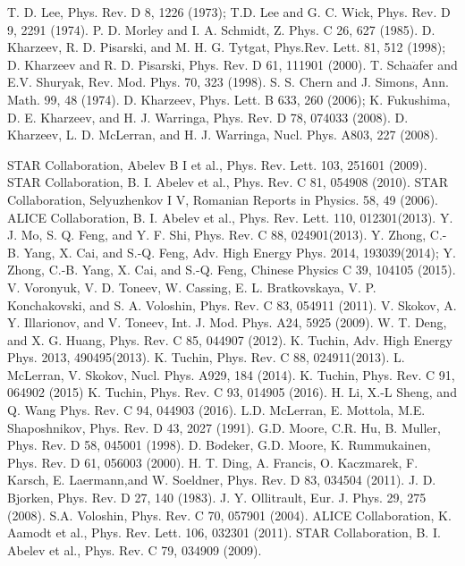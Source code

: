 \documentclass[twocolumn,showpacs,preprintnumbers,amsmath,amssymb]{revtex4}
\begin{document}
\begin{thebibliography}{}
 T. D. Lee, Phys. Rev. D 8, 1226 (1973); T.D. Lee and G. C. Wick, Phys. Rev. D 9, 2291 (1974).
 P. D. Morley and I. A. Schmidt, Z. Phys. C 26, 627 (1985).
 D. Kharzeev, R. D. Pisarski, and M. H. G. Tytgat, Phys.Rev. Lett. 81, 512 (1998); D. Kharzeev and R. D. Pisarski,
Phys. Rev. D 61, 111901 (2000).
 T. Scha$\ddot{a}$fer and E.V. Shuryak, Rev. Mod. Phys. 70, 323 (1998).
 S. S. Chern and J. Simons, Ann. Math. 99, 48 (1974).
 D. Kharzeev, Phys. Lett. B 633, 260 (2006); K. Fukushima, D. E. Kharzeev, and H. J. Warringa, Phys.
Rev. D 78, 074033 (2008).
 D. Kharzeev, L. D. McLerran, and H. J. Warringa, Nucl. Phys. A803, 227 (2008).


 STAR Collaboration, Abelev B I et al., Phys. Rev. Lett. 103, 251601 (2009).
 STAR Collaboration, B. I. Abelev et al., Phys. Rev. C 81, 054908 (2010).
 STAR Collaboration, Selyuzhenkov I V, Romanian Reports in Physics. 58, 49 (2006).
 ALICE Collaboration, B. I. Abelev et al., Phys. Rev. Lett. 110, 012301(2013).
 Y. J. Mo, S. Q. Feng, and Y. F. Shi,  Phys. Rev. C 88,  024901(2013).
 Y. Zhong, C.-B. Yang, X. Cai, and S.-Q. Feng, Adv. High Energy Phys. 2014, 193039(2014); Y. Zhong, C.-B. Yang, X. Cai, and S.-Q. Feng, Chinese Physics C 39, 104105 (2015).
 V. Voronyuk, V. D. Toneev, W. Cassing, E. L. Bratkovskaya, V. P. Konchakovski, and S. A. Voloshin, Phys. Rev. C 83, 054911 (2011).
 V. Skokov, A. Y. Illarionov, and V. Toneev, Int. J. Mod. Phys. A24, 5925 (2009).
 W. T. Deng, and X. G. Huang, Phys. Rev. C 85, 044907 (2012).
 K. Tuchin,  Adv. High Energy Phys. 2013, 490495(2013).
 K. Tuchin, Phys. Rev. C 88, 024911(2013).
 L. McLerran, V. Skokov, Nucl. Phys. A929, 184 (2014).
 K. Tuchin, Phys. Rev. C 91, 064902 (2015)
 K. Tuchin, Phys. Rev. C 93, 014905 (2016).
 H. Li, X.-L Sheng, and Q. Wang Phys. Rev. C 94, 044903 (2016).
 L.D. McLerran, E. Mottola, M.E. Shaposhnikov, Phys. Rev. D 43, 2027 (1991).
 G.D. Moore, C.R. Hu, B. Muller, Phys. Rev. D 58,  045001 (1998).
 D. B$\ddot{o}$deker, G.D. Moore, K. Rummukainen, Phys. Rev. D 61, 056003 (2000).
 H. T. Ding, A. Francis, O. Kaczmarek, F. Karsch, E. Laermann,and W. Soeldner, Phys. Rev. D 83, 034504 (2011).
 J. D. Bjorken, Phys. Rev. D 27, 140 (1983).
 J. Y. Ollitrault, Eur. J. Phys. 29, 275 (2008).
 S.A. Voloshin, Phys. Rev. C 70, 057901 (2004).
 ALICE Collaboration, K. Aamodt et al., Phys. Rev. Lett. 106, 032301 (2011).
 STAR Collaboration, B. I. Abelev et al., Phys. Rev. C 79, 034909 (2009).
\end{thebibliography}{}
\end{document}
